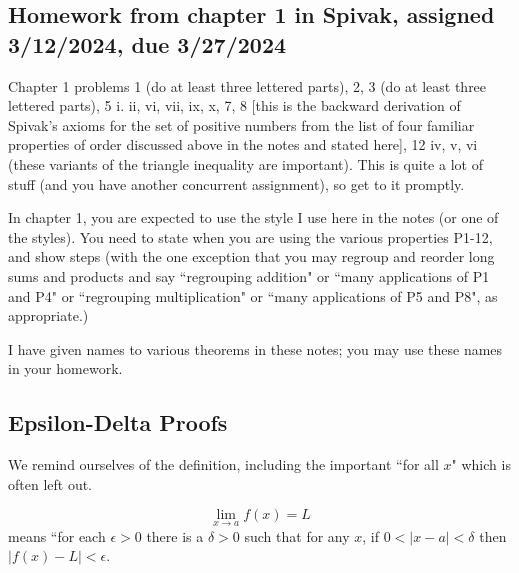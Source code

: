 \documentclass[12pt]{article}
\begin{document}
\newpage

\subsection{Homework from chapter 1 in Spivak, assigned 3/12/2024, due 3/27/2024}

Chapter 1  problems 1 (do at least three lettered parts), 2,  3 (do at least three lettered parts),  5 i. ii, vi, vii, ix, x, 7, 8 [this is the backward derivation of Spivak's axioms for the set of positive numbers from the list of four familiar properties of order discussed above in the notes and stated here], 12 iv, v, vi 
(these variants of the triangle inequality are important).  This is quite a lot of stuff (and you have another concurrent assignment), so get to it promptly.

In chapter 1, you are expected to use the style I use here in the notes (or one of the styles).  You need to state when you are using the various properties P1-12, and show steps (with the one exception
that you may regroup and reorder long sums and products and say ``regrouping addition" or ``many applications of P1 and P4" or ``regrouping multiplication" or ``many applications of P5 and P8", as appropriate.) 

I have given names to various theorems in these notes; you may use these names in your homework.


\subsection{Epsilon-Delta Proofs}

We remind ourselves of the definition, including the important ``for all $x$" which is often left out.

$$\lim_{x \rightarrow a}f(x)=L$$ means ``for each $\epsilon >0$ there is a $\delta>0$ such that for any $x$, if $0<|x-a|<\delta$ then $|f(x)-L|<\epsilon$.
\end{document}
